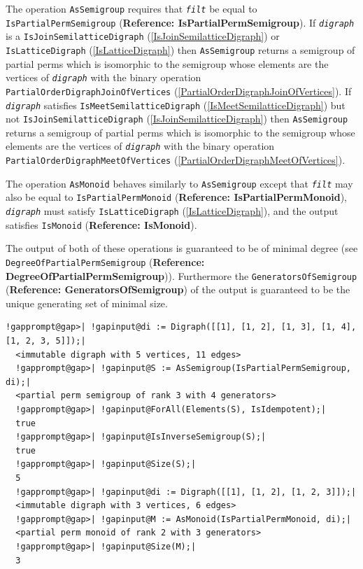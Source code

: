 \documentclass[a4paper,11pt]{report}
\begin{document}
{{{ The operation \texttt{AsSemigroup} requires that \mbox{\texttt{\mdseries\slshape filt}} be equal to \texttt{IsPartialPermSemigroup} (\textbf{Reference: IsPartialPermSemigroup}). If \mbox{\texttt{\mdseries\slshape digraph}} is a \texttt{IsJoinSemilatticeDigraph} (\ref{IsJoinSemilatticeDigraph}) or \texttt{IsLatticeDigraph} (\ref{IsLatticeDigraph}) then \texttt{AsSemigroup} returns a semigroup of partial perms which is isomorphic to the semigroup
whose elements are the vertices of \mbox{\texttt{\mdseries\slshape digraph}} with the binary operation \texttt{PartialOrderDigraphJoinOfVertices} (\ref{PartialOrderDigraphJoinOfVertices}). If \mbox{\texttt{\mdseries\slshape digraph}} satisfies \texttt{IsMeetSemilatticeDigraph} (\ref{IsMeetSemilatticeDigraph}) but not \texttt{IsJoinSemilatticeDigraph} (\ref{IsJoinSemilatticeDigraph}) then \texttt{AsSemigroup} returns a semigroup of partial perms which is isomorphic to the semigroup
whose elements are the vertices of \mbox{\texttt{\mdseries\slshape digraph}} with the binary operation \texttt{PartialOrderDigraphMeetOfVertices} (\ref{PartialOrderDigraphMeetOfVertices}). 

 The operation \texttt{AsMonoid} behaves similarly to \texttt{AsSemigroup} except that \mbox{\texttt{\mdseries\slshape filt}} may also be equal to \texttt{IsPartialPermMonoid} (\textbf{Reference: IsPartialPermMonoid}), \mbox{\texttt{\mdseries\slshape digraph}} must satisfy \texttt{IsLatticeDigraph} (\ref{IsLatticeDigraph}), and the output satisfies \texttt{IsMonoid} (\textbf{Reference: IsMonoid}). 

 The output of both of these operations is guaranteed to be of minimal degree
(see \texttt{DegreeOfPartialPermSemigroup} (\textbf{Reference: DegreeOfPartialPermSemigroup})). Furthermore the \texttt{GeneratorsOfSemigroup} (\textbf{Reference: GeneratorsOfSemigroup}) of the output is guaranteed to be the unique generating set of minimal size. 
\begin{Verbatim}[commandchars=!@|,fontsize=\small,frame=single,label=Example]
  !gapprompt@gap>| !gapinput@di := Digraph([[1], [1, 2], [1, 3], [1, 4], [1, 2, 3, 5]]);|
  <immutable digraph with 5 vertices, 11 edges>
  !gapprompt@gap>| !gapinput@S := AsSemigroup(IsPartialPermSemigroup, di);|
  <partial perm semigroup of rank 3 with 4 generators>
  !gapprompt@gap>| !gapinput@ForAll(Elements(S), IsIdempotent);|
  true
  !gapprompt@gap>| !gapinput@IsInverseSemigroup(S);|
  true
  !gapprompt@gap>| !gapinput@Size(S);|
  5
  !gapprompt@gap>| !gapinput@di := Digraph([[1], [1, 2], [1, 2, 3]]);|
  <immutable digraph with 3 vertices, 6 edges>
  !gapprompt@gap>| !gapinput@M := AsMonoid(IsPartialPermMonoid, di);|
  <partial perm monoid of rank 2 with 3 generators>
  !gapprompt@gap>| !gapinput@Size(M);|
  3
\end{Verbatim}
 }

}}
\end{document}
